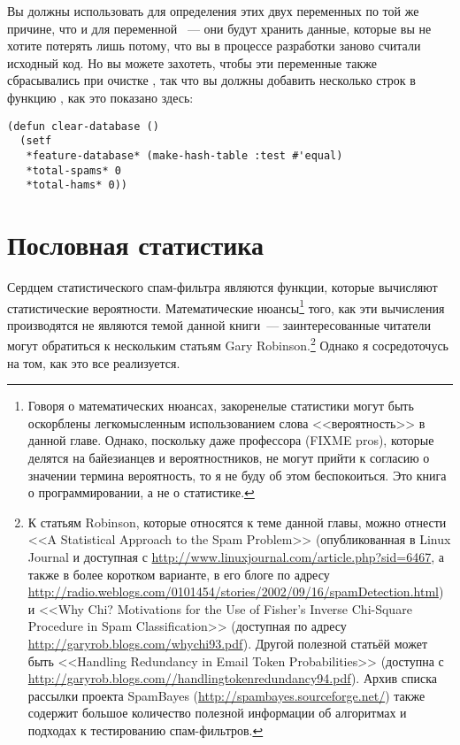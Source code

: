 Вы должны использовать  для определения этих двух переменных по той же
причине, что и для переменной ~--- они будут хранить данные,
которые вы не хотите потерять лишь потому, что вы в процессе разработки заново считали
исходный код.  Но вы можете захотеть, чтобы эти переменные также сбрасывались при очистке
, так что вы должны добавить несколько строк в функцию
, как это показано здесь:

\begin{lstlisting}
(defun clear-database ()
  (setf
   *feature-database* (make-hash-table :test #'equal)
   *total-spams* 0
   *total-hams* 0))
\end{lstlisting}

\section{Пословная статистика}

Сердцем статистического спам-фильтра являются функции, которые вычисляют статистические
вероятности.  Математические нюансы\footnote{Говоря о математических нюансах, закоренелые
  статистики могут быть оскорблены легкомысленным использованием слова <<вероятность>> в
  данной главе.  Однако, поскольку даже профессора (FIXME pros), которые делятся на
  байезианцев и вероятностников, не могут прийти к согласию о значении термина
  вероятность, то я не буду об этом беспокоиться.  Это книга о программировании, а не о
  статистике.} того, как эти вычисления производятся не являются темой данной книги~---
заинтересованные читатели могут обратиться к нескольким статьям Gary Robinson.\footnote{К
  статьям Robinson, которые относятся к теме данной главы, можно отнести <<A Statistical
  Approach to the Spam Problem>> (опубликованная в Linux Journal и доступная с
  \url{http://www.linuxjournal.com/article.php?sid=6467}, а также в более коротком
  варианте, в его блоге по адресу
  \url{http://radio.weblogs.com/0101454/stories/2002/09/16/spamDetection.html}) и <<Why
  Chi?  Motivations for the Use of Fisher's Inverse Chi-Square Procedure in Spam
  Classification>> (доступная по адресу \url{http://garyrob.blogs.com/whychi93.pdf}).
  Другой полезной статьёй может быть <<Handling Redundancy in Email Token Probabilities>>
  (доступна с \url{http://garyrob.blogs.com//handlingtokenredundancy94.pdf}).  Архив
  списка рассылки проекта SpamBayes (\url{http://spambayes.sourceforge.net/}) также
  содержит большое количество полезной информации об алгоритмах и подходах к тестированию
  спам-фильтров.}  Однако я сосредоточусь на том, как это все реализуется.

